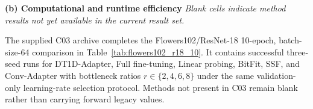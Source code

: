 \documentclass[pdflatex,sn-mathphys-num]{sn-jnl}
\theoremstyle{thmstyleone}
\theoremstyle{thmstyletwo}
\theoremstyle{thmstylethree}
\begin{document}
\begin{table}[!t]
\vspace{5pt}
\textbf{(b) Computational and runtime efficiency}
\vspace{2pt}
\vspace{2pt}
{\footnotesize\textit{Blank cells indicate method results not yet available in the current result set.}}
\end{table}

The supplied C03 archive completes the Flowers102/ResNet-18 10-epoch, batch-size-64 comparison in Table~\ref{tab:flowers102_r18_10}. It contains successful three-seed runs for DT1D-Adapter, Full fine-tuning, Linear probing, BitFit, SSF, and Conv-Adapter with bottleneck ratios $r\in\{2,4,6,8\}$ under the same validation-only learning-rate selection protocol. Methods not present in C03 remain blank rather than carrying forward legacy values.
\end{document}
